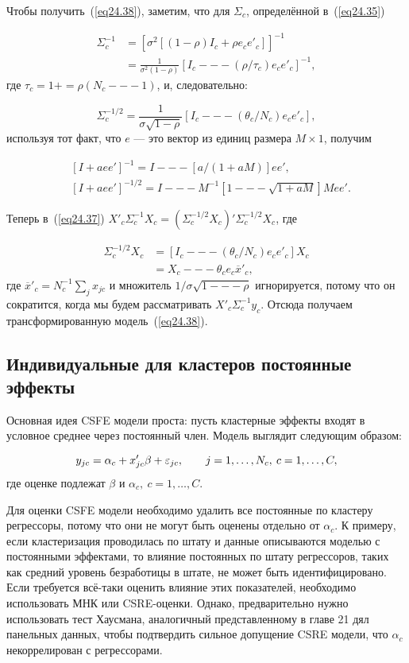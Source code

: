 Чтобы получить~(\ref{eq24.38}), заметим, что для $\Sigma_c$, определённой в~(\ref{eq24.35}) 

\begin{align}
\Sigma_c^{-1} & = \left[ \sigma^2 [(1-\rho)I_c + \rho e_c e'_c] \right]^{-1} \nonumber\\
& =  \frac{1}{\sigma^2 (1-\rho)} [I_c --- (\rho / \tau_c) e_c e'_c]^{-1}, \nonumber
\end{align}
где $\tau_c = 1 + =\rho (N_c --- 1)$, и, следовательно:

$$
\Sigma_c^{-1/2}=  \frac{1}{\sigma \sqrt{1-\rho}} [I_c --- (\theta_c / N_c) e_c e'_c], 
$$
используя тот факт, что $e$ --- это вектор из единиц размера $M \times 1$, получим

\begin{align}
& [I+aee']^{-1} = I --- [a/(1+aM)] ee', \nonumber\\
& [I+aee']^{-1/2} = I --- M^{-1}[ 1 --- \sqrt{1+aM}]M ee'. \nonumber
\end{align}

Теперь в~(\ref{eq24.37}) $X'_c \Sigma_c^{-1} X_c = \left( \Sigma_c^{-1/2} X_c \right)' \Sigma_c^{-1/2} X_c$, где

\begin{align}
\Sigma_c^{-1/2} X_c & = [I_c --- (\theta_c / N_c) e_c e'_c]X_c \nonumber\\
& = X_c --- \theta_c e_c \overline{x}'_c, \nonumber
\end{align}
где $\overline{x}'_c = N_c^{-1} \sum_j x_{jc}$ и множитель $1 / \sigma \sqrt{ 1 --- \rho}$ игнорируется, потому что он сократится, когда мы будем рассматривать $X'_c \Sigma_c^{-1} y_c$. Отсюда получаем трансформированную модель~(\ref{eq24.38}). 

\subsection{Индивидуальные для кластеров постоянные эффекты}

Основная идея CSFE модели проста: пусть кластерные эффекты входят в условное среднее через постоянный член. Модель выглядит следующим образом:

\begin{equation}
\label{eq24.40}
y_{jc} = \alpha_c + x'_{jc} \beta + \varepsilon_{jc}, \qquad j = 1, \dots , N_c, \: c = 1, \dots , C,
\end{equation}
где оценке подлежат $\beta$ и $\alpha_c, \: c = 1, \dots, C$. 

Для оценки CSFE модели необходимо удалить все постоянные по кластеру регрессоры, потому что они не могут быть оценены отдельно от $\alpha_c$. К примеру, если кластеризация проводилась по штату и данные описываются моделью с постоянными эффектами, то влияние постоянных по штату регрессоров, таких как средний уровень безработицы в штате, не может быть идентифицировано. Если требуется всё-таки оценить влияние этих показателей, необходимо использовать МНК или CSRE-оценки. Однако, предварительно нужно использовать тест Хаусмана, аналогичный представленному в главе 21 дял панельных данных, чтобы подтвердить сильное допущение CSRE модели, что $\alpha_c$ некоррелирован с регрессорами. 

